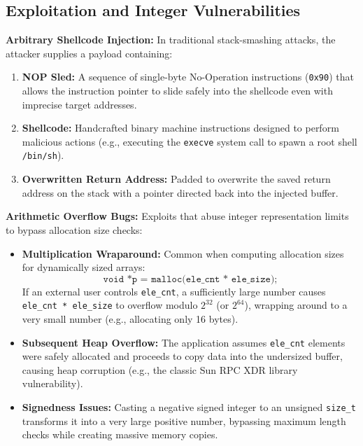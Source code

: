 \subsection{Exploitation and Integer Vulnerabilities}

\begin{definition}
    \textbf{Arbitrary Shellcode Injection:}
    In traditional stack-smashing attacks, the attacker supplies a payload containing:
    \begin{enumerate}
        \item \textbf{NOP Sled:} A sequence of single-byte No-Operation instructions (\texttt{0x90}) that allows the instruction pointer to slide safely into the shellcode even with imprecise target addresses.
        \item \textbf{Shellcode:} Handcrafted binary machine instructions designed to perform malicious actions (e.g., executing the \texttt{execve} system call to spawn a root shell \texttt{/bin/sh}).
        \item \textbf{Overwritten Return Address:} Padded to overwrite the saved return address on the stack with a pointer directed back into the injected buffer.
    \end{enumerate}
\end{definition}

\begin{definition}
    \textbf{Arithmetic Overflow Bugs:}
    Exploits that abuse integer representation limits to bypass allocation size checks:
    \begin{itemize}
        \item \textbf{Multiplication Wraparound:} Common when computing allocation sizes for dynamically sized arrays:
        $$
            \texttt{void *p = malloc(ele\_cnt * ele\_size);}
        $$
        If an external user controls \texttt{ele\_cnt}, a sufficiently large number causes \texttt{ele\_cnt * ele\_size} to overflow modulo $2^{32}$ (or $2^{64}$), wrapping around to a very small number (e.g., allocating only 16 bytes).
        \item \textbf{Subsequent Heap Overflow:} The application assumes \texttt{ele\_cnt} elements were safely allocated and proceeds to copy data into the undersized buffer, causing heap corruption (e.g., the classic Sun RPC XDR library vulnerability).
        \item \textbf{Signedness Issues:} Casting a negative signed integer to an unsigned \texttt{size\_t} transforms it into a very large positive number, bypassing maximum length checks while creating massive memory copies.
    \end{itemize}
\end{definition}

